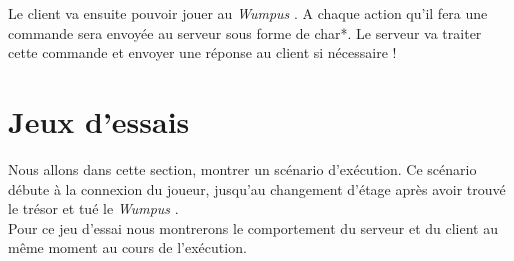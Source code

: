 \documentclass[a4paper,10pt]{article}
\newcommand{\gameName}{\emph{Wumpus }}
\begin{document}
	Le client va ensuite pouvoir jouer au \gameName. A chaque action qu'il fera une commande sera envoyée au serveur sous forme de char*. Le serveur va traiter
	cette commande et envoyer une réponse au client si nécessaire !





	\newpage
	\section{Jeux d'essais}
	
		Nous allons dans cette section, montrer un scénario d'exécution. Ce scénario débute à la connexion du joueur, jusqu'au changement d'étage après avoir
trouvé le trésor et tué le \gameName.\\

Pour ce jeu d'essai nous montrerons le comportement du serveur et du client au même moment au cours de l'exécution.
\end{document}
